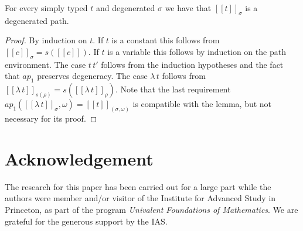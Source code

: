\documentclass[10pt,a4paper]{article}
\newcommand{\sbr}[1]{[\![#1]\!]}
\newcommand{\semr}[1]{[\![#1]\!]_{\rho}}
\newcommand{\sems}[1]{[\![#1]\!]_{\sigma}}
\begin{document}
\begin{lemma}\label{degeneracy_preserved}
For every simply typed $t$ and degenerated $\sigma$ we have that
$\sems{t}$ is a degenerated path.
\end{lemma}
\begin{proof} By induction on $t$. 
If $t$ is a constant this follows from $\sems{c} = s(\sbr{c})$.
If $t$ is a variable this follows by induction on the path environment.
The case $t\,t'$ follows from the induction hypotheses and the fact that
$ap_1$ preserves degeneracy.
The case $\lambda\,t$ follows from $\sbr{\lambda\,t}_{s(\rho)} = s(\semr{\lambda\,t})$.
Note that the last requirement 
$ap_1(\sems{\lambda\,t},\omega) = \sbr{t}_{(\sigma,\omega)}$ 
is compatible with the lemma, but not necessary for its proof.
\end{proof}

\section*{Acknowledgement}
The research for this paper has been carried out for a large part while the authors
were member and/or visitor of the Institute for Advanced Study in Princeton, as
part of the program \emph{Univalent Foundations of Mathematics}. 
We are grateful for the generous support by the IAS.
\end{document}
